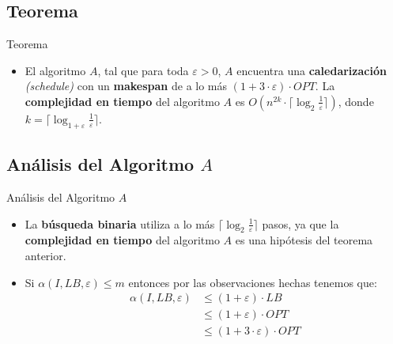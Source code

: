 \renewcommand{\subsectiontitle}{Teorema}
\subsection{\subsectiontitle}
\begin{frame}{\subsectiontitle}
    \begin{itemize}
        \item El algoritmo \(A\), tal que para toda \(\varepsilon > 0\), \(A\) encuentra una \textbf{caledarización} \textit{(schedule)}
        con un \textbf{makespan} de a lo más \(\left(1 + 3\cdot \varepsilon\right)\cdot OPT\). La \textbf{complejidad en tiempo} del
        algoritmo \(A\) es \(O\left(n^{2k} \cdot \lceil \log_{2} \frac{1}{\varepsilon} \rceil \right)\), donde 
        \(k = \lceil \log_{1 + \varepsilon} \frac{1}{\varepsilon} \rceil\).
    \end{itemize}   
\end{frame}

\renewcommand{\subsectiontitle}{Análisis del Algoritmo \(A\)}
\subsection{\subsectiontitle}
\begin{frame}{\subsectiontitle}
    \begin{itemize}
    \item La \textbf{búsqueda binaria} utiliza a lo más \(\lceil \log_{2} \frac{1}{\varepsilon} \rceil\) pasos, ya que 
    la \textbf{complejidad en tiempo} del algoritmo \(A\) es una hipótesis del teorema anterior.
    \item Si \(\alpha\left(I, LB, \varepsilon\right) \leq m\) entonces por las observaciones hechas tenemos que:
    \begin{align*}
        \alpha\left(I, LB, \varepsilon\right) &\leq \left(1 + \varepsilon \right) \cdot LB \\
                                                     &\leq \left(1 + \varepsilon \right) \cdot OPT \\
                                                     &\leq \left(1 + 3 \cdot \varepsilon \right) \cdot OPT
    \end{align*}
    \end{itemize}
\end{frame}

